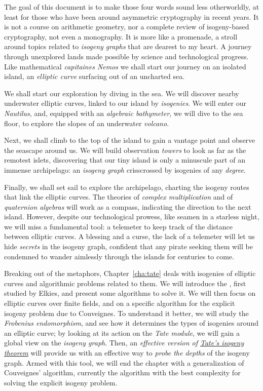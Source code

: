 \documentclass{report}
\theoremstyle{plain}
\theoremstyle{definition}
\begin{document}
The goal of this document is to make those four words sound less
otherworldly, at least for those who have been around asymmetric
cryptography in recent years. %
It is not a course on arithmetic geometry, nor a complete review of
isogeny-based cryptography, not even a monography. %
It is more like a promenade, a stroll around topics related to
\emph{isogeny graphs} that are dearest to my heart. %
A journey through unexplored lands made possible by science and
technological progress. %
Like mathematical \emph{capitaines Nemos} we shall start our journey
on an isolated island, an \emph{elliptic curve} surfacing out of an
uncharted sea. %

We shall start our exploration by diving in the sea. %
We will discover nearby underwater elliptic curves, linked to our
island by \emph{isogenies}. %
We will enter our \emph{Nautilus}, and, equipped with an
\emph{algebraic bathymeter}, we will dive to the sea floor, to explore
the slopes of an underwater \emph{volcano}. %

Next, we shall climb to the top of the island to gain a vantage point
and observe the seascape around us. %
We will build observation \emph{towers} to look as far as the remotest
islets, discovering that our tiny island is only a minuscule part of
an immense archipelago: an \emph{isogeny graph} crisscrossed by
isogenies of any \emph{degree}.

Finally, we shall set sail to explore the archipelago, charting the
isogeny routes that link the elliptic curves. %
The theories of \emph{complex multiplication} and of \emph{quaternion
  algebras} will work as a compass, indicating the direction to the
next island. %
However, despite our technological prowess, like seamen in a starless
night, we will miss a fundamental tool: a telemeter to keep track of
the distance between elliptic curves. %
A blessing and a curse, the lack of a telemeter will let us hide
\emph{secrets} in the isogeny graph, confident that any pirate seeking
them will be condemned to wander aimlessly through the islands for
centuries to come.

Breaking out of the metaphors, Chapter~\ref{cha:tate} deals with
isogenies of elliptic curves and algorithmic problems related to
them. %
We will introduce the , first studied by
Elkies, and present some algorithms to solve it. %
We will then focus on elliptic curves over finite fields, and on a
specific algorithm for the explicit isogeny problem due to
Couveignes. %
To understand it better, we will study the \emph{Frobenius
  endomorphism}, and see how it determines the types of isogenies
around an elliptic curve; by looking at its action on the \emph{Tate
  module}, we will gain a global view on the \emph{isogeny graph}. %
Then, an \emph{effective version of \hyperref[th:tate]{Tate's isogeny
    theorem}} will provide us with an effective way to \emph{probe the
  depths} of the isogeny graph. %
Armed with this tool, we will end the chapter with a generalization of
Couveignes' algorithm, currently the algorithm with the best
complexity for solving the explicit isogeny problem. %
\end{document}
